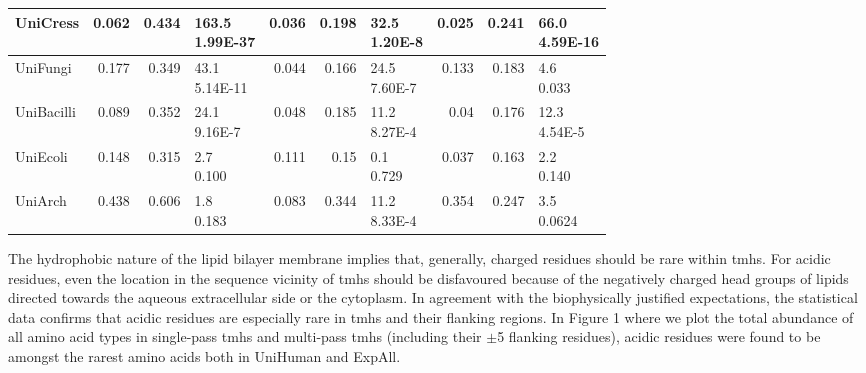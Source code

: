 \begin{table}[htbp]
{\begin{tabular}{p{5em}rrp{5em}rrp{5em}rrp{5em}}
    \midrule
    UniCress & 0.062 & 0.434 & \specialcell{163.5 \\ 1.99E-37} & 0.036 & 0.198 & \specialcell{32.5 \\ 1.20E-8} & 0.025 & 0.241 & \specialcell{66.0 \\ 4.59E-16} \\
    \midrule
    UniFungi & 0.177 & 0.349 & \specialcell{43.1 \\ 5.14E-11} & 0.044 & 0.166 & \specialcell{24.5 \\ 7.60E-7} & 0.133 & 0.183 & \specialcell{4.6 \\ 0.033 }\\
    \midrule
    UniBacilli & 0.089 & 0.352 & \specialcell{24.1 \\ 9.16E-7} & 0.048 & 0.185 & \specialcell{11.2 \\ 8.27E-4} & 0.04  & 0.176 & \specialcell{12.3 \\ 4.54E-5} \\
    \midrule
    UniEcoli & 0.148 & 0.315 & \specialcell{2.7 \\ 0.100} & 0.111 & 0.15  & \specialcell{0.1 \\ 0.729 }& 0.037 & 0.163 & \specialcell{2.2 \\ 0.140 }\\
    \midrule
    UniArch & 0.438 & 0.606 & \specialcell{1.8 \\ 0.183} & 0.083 & 0.344 & \specialcell{11.2 \\ 8.33E-4} & 0.354 & 0.247 & \specialcell{3.5 \\ 0.0624 }\\
    \bottomrule
   \end{tabular}}%
   \label{table:acidicresiduesarerare}

\end{table}%

The hydrophobic nature of the lipid bilayer membrane implies that, generally, charged residues should be rare within \gls{tmh}s.
For acidic residues, even the location in the sequence vicinity of \gls{tmh}s should be disfavoured because of the negatively charged head groups of lipids directed towards the aqueous extracellular side or the cytoplasm.
In agreement with the biophysically justified expectations, the statistical data confirms that acidic residues are especially rare in \gls{tmh}s and their flanking regions.
In Figure 1 where we plot the total abundance of all amino acid types in single-pass \gls{tmh}s and multi-pass \gls{tmh}s (including their $\pm$5 flanking residues), acidic residues were found to be amongst the rarest amino acids both in UniHuman and ExpAll.

